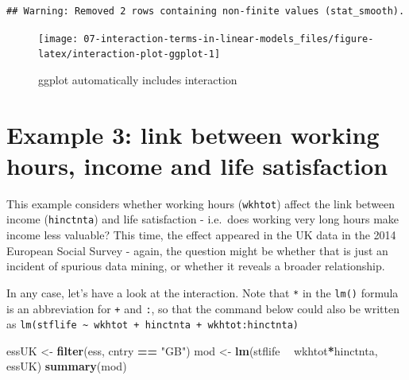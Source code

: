 \documentclass[
]{book}
\newenvironment{Shaded}{\begin{snugshade}}{\end{snugshade}}
\newcommand{\KeywordTok}[1]{\textcolor[rgb]{0.13,0.29,0.53}{\textbf{#1}}}
\newcommand{\NormalTok}[1]{#1}
\newcommand{\OperatorTok}[1]{\textcolor[rgb]{0.81,0.36,0.00}{\textbf{#1}}}
\newcommand{\StringTok}[1]{\textcolor[rgb]{0.31,0.60,0.02}{#1}}
\begin{document}
\begin{verbatim}
## Warning: Removed 2 rows containing non-finite values (stat_smooth).
\end{verbatim}

\begin{figure}

{\centering \texttt{[image: 07-interaction-terms-in-linear-models\_files/figure-latex/interaction-plot-ggplot-1]} 

}

\caption{ggplot automatically includes interaction}\label{fig:interaction-plot-ggplot}
\end{figure}

\hypertarget{example-3-link-between-working-hours-income-and-life-satisfaction}{%
\section{Example 3: link between working hours, income and life satisfaction}\label{example-3-link-between-working-hours-income-and-life-satisfaction}}

This example considers whether working hours (\texttt{wkhtot}) affect the link between income (\texttt{hinctnta}) and life satisfaction - i.e.~does working very long hours make income less valuable? This time, the effect appeared in the UK data in the 2014 European Social Survey - again, the question might be whether that is just an incident of spurious data mining, or whether it reveals a broader relationship.

In any case, let's have a look at the interaction. Note that \texttt{*} in the \texttt{lm()} formula is an abbreviation for \texttt{+} and \texttt{:}, so that the command below could also be written as \texttt{lm(stflife\ \textasciitilde{}\ wkhtot\ +\ hinctnta\ +\ wkhtot:hinctnta)}

\begin{Shaded}
\begin{Highlighting}[]
\NormalTok{essUK <-}\StringTok{ }\KeywordTok{filter}\NormalTok{(ess, cntry }\OperatorTok{==}\StringTok{ "GB"}\NormalTok{)}
\NormalTok{mod <-}\StringTok{ }\KeywordTok{lm}\NormalTok{(stflife }\OperatorTok{~}\StringTok{ }\NormalTok{wkhtot}\OperatorTok{*}\NormalTok{hinctnta, essUK) }
\KeywordTok{summary}\NormalTok{(mod)}
\end{Highlighting}
\end{Shaded}
\end{document}
